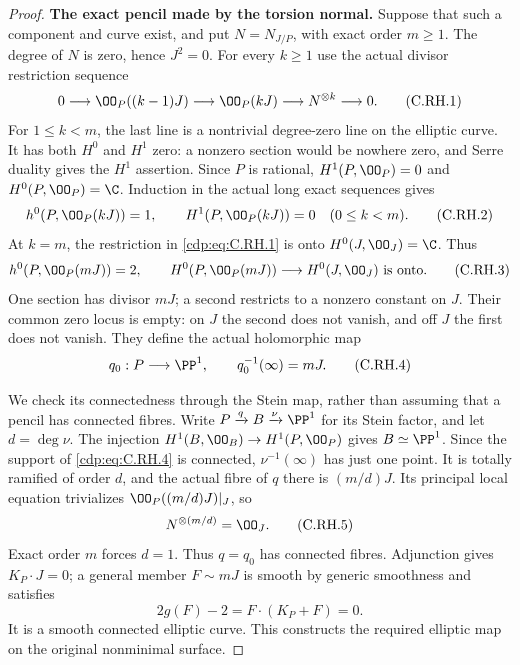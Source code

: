 \begin{proof}
\par\medskip\noindent\textbf{The exact pencil made by the torsion normal.}
Suppose that such a component and curve exist, and put
\(N=N_{J/P}\), with exact order \(m\ge1\).
The degree of \(N\) is zero, hence \(J^2=0\).
For every \(k\ge1\) use the actual divisor restriction
sequence
\[
 0\longrightarrow\OO_P((k-1)J)
 \longrightarrow\OO_P(kJ)
 \longrightarrow N^{\otimes k}\longrightarrow0.
 \tag{C.RH.1}\label{cdp:eq:C.RH.1}
\]
For \(1\le k<m\), the last line is a nontrivial
degree-zero line on the elliptic curve. It has
both \(H^0\) and \(H^1\) zero: a nonzero section
would be nowhere zero, and Serre duality gives
the \(H^1\) assertion. Since \(P\) is rational,
\(H^1(P,\OO_P)=0\) and \(H^0(P,\OO_P)=\C\).
Induction in the actual long exact sequences gives
\[
 h^0(P,\OO_P(kJ))=1,\qquad
 H^1(P,\OO_P(kJ))=0\quad(0\le k<m).
 \tag{C.RH.2}\label{cdp:eq:C.RH.2}
\]
At \(k=m\), the restriction in \eqref{cdp:eq:C.RH.1} is
onto \(H^0(J,\OO_J)=\C\). Thus
\[
 h^0(P,\OO_P(mJ))=2,\qquad
 H^0(P,\OO_P(mJ))\longrightarrow H^0(J,\OO_J)
                         \text{ is onto}.
 \tag{C.RH.3}\label{cdp:eq:C.RH.3}
\]
One section has divisor \(mJ\); a second restricts
to a nonzero constant on \(J\). Their common
zero locus is empty: on \(J\) the second
does not vanish, and off \(J\) the first
does not vanish. They define the actual
holomorphic map
\[
                   q_0:P\longrightarrow\PP^1,\qquad
                             q_0^{-1}(\infty)=mJ .
 \tag{C.RH.4}\label{cdp:eq:C.RH.4}
\]

We check its connectedness through the Stein map,
rather than assuming that a pencil has connected
fibres. Write \(P\xrightarrow q B\xrightarrow\nu\PP^1\)
for its Stein factor, and let \(d=\deg\nu\).
The injection \(H^1(B,\OO_B)\to H^1(P,\OO_P)\)
gives \(B\simeq\PP^1\).
Since the support of \eqref{cdp:eq:C.RH.4} is connected,
\(\nu^{-1}(\infty)\) has just one point.
It is totally ramified of order \(d\), and
the actual fibre of \(q\) there is
\((m/d)J\). Its principal local equation
trivializes \(\OO_P((m/d)J)|_J\), so
\[
                   N^{\otimes(m/d)}=\OO_J.
 \tag{C.RH.5}\label{cdp:eq:C.RH.5}
\]
Exact order \(m\) forces \(d=1\).
Thus \(q=q_0\) has connected fibres.
Adjunction gives \(K_P\cdot J=0\);
a general member \(F\sim mJ\) is smooth
by generic smoothness and satisfies
\[
                 2g(F)-2=F\cdot(K_P+F)=0.
 \tag{C.RH.6}\label{cdp:eq:C.RH.6}
\]
It is a smooth connected elliptic curve.
This constructs the required elliptic
map on the original nonminimal surface.


\end{proof}
